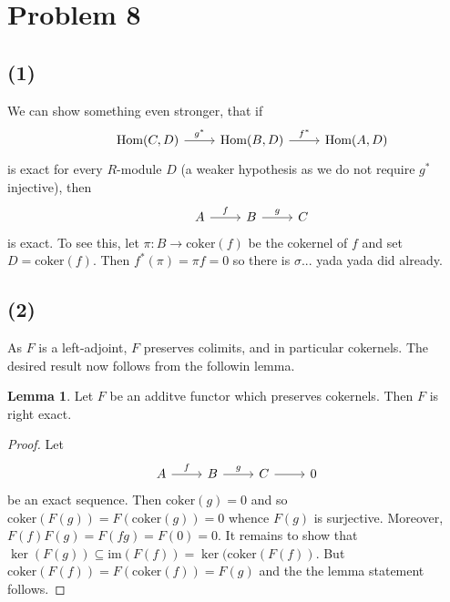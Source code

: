 \documentclass{article}
\theoremstyle{definition}
\newtheorem{lemma}[theorem]{Lemma}
\newcommand{\Hom}{\text{Hom}}
\newcommand{\coker}{\text{coker}}
\newcommand{\im}{\text{im}}
\begin{document}
\section*{Problem 8}

\subsection*{(1)}
We can show something even stronger, that 
if 
\[
	\begin{tikzcd}
	& \Hom(C, D)
	\ar{r}{g^{*}}
	& \Hom(B, D)
	\ar{r}{f^{*}}
	& \Hom(A, D)
	\end{tikzcd}
\]
is exact for every $R$-module $D$ (a weaker hypothesis as we do not require
$g^{*}$ injective), then
\[
	\begin{tikzcd}
	& A
	\ar{r}{f}
	& B
	\ar{r}{g}
	& C
	\end{tikzcd}
\] 
is exact. To see this, let $\pi : B \to \coker(f)$ be the cokernel of $f$
and set $D = \coker(f)$. Then $f^{*}(\pi) = \pi f = 0$ so there is $\sigma$...
yada yada did already.

\subsection*{(2)}

As $F$ is a left-adjoint, $F$ preserves colimits, and in particular 
cokernels. The desired result now follows from the followin lemma.

\begin{lemma}
	Let $F$ be an additve functor which preserves cokernels. Then $F$ is right
	exact.
\end{lemma}
\begin{proof}
	Let 
	\[
	\begin{tikzcd}
	A
	\ar{r}{f}
	& B
	\ar{r}{g}
	& C
	\ar{r}
	& 0
	\end{tikzcd}
	\] 
	be an exact sequence. Then $\coker(g) = 0$ and so $\coker(F(g)) =
	F(\coker(g)) = 0$ whence $F(g)$ is surjective. Moreover, $F(f) F(g) = F(fg)
	=F(0) = 0$. It remains to show that $\ker(F(g)) \subseteq \im(F(f)) =
	\ker(\coker(F(f))$. But $\coker(F(f)) = F(\coker(f)) = F(g)$ and the the
	lemma statement follows.
\end{proof}
\end{document}
